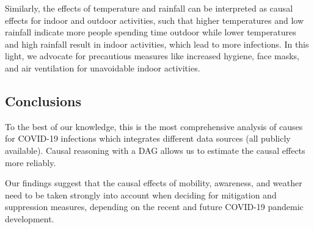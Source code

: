 \documentclass[]{elsarticle} %
\begin{document}
Similarly, the effects of temperature and rainfall can be interpreted as causal effects for indoor and outdoor activities, such that higher temperatures and low rainfall indicate more people spending time outdoor while lower temperatures and high rainfall result in indoor activities, which lead to more infections. In this light, we advocate for precautious measures like increased hygiene, face masks, and air ventilation for unavoidable indoor activities.

\hypertarget{conclusions}{%
\subsection{Conclusions}\label{conclusions}}

To the best of our knowledge, this is the most comprehensive analysis of causes for COVID-19 infections which integrates different data sources (all publicly available). Causal reasoning with a DAG allows us to estimate the causal effects more reliably.

Our findings suggest that the causal effects of mobility, awareness, and weather need to be taken strongly into account when deciding for mitigation and suppression measures, depending on the recent and future COVID-19 pandemic development.

\renewcommand\refname{References}

\end{document}
